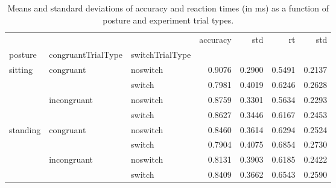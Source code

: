 \begin{table}
\centering
\caption{Means and standard deviations of accuracy and reaction times (in ms) as a function of posture and experiment trial types.}
\label{table-task-switching-replication-reaction-time}
\begin{tabular}{lllrrrr}
\toprule
         &             &        & accuracy &    std &     rt &    std \\
posture & congruantTrialType & switchTrialType &          &        &        &        \\
\midrule
sitting & congruant & noswitch &   0.9076 & 0.2900 & 0.5491 & 0.2137 \\
         &             & switch &   0.7981 & 0.4019 & 0.6246 & 0.2628 \\
         & incongruant & noswitch &   0.8759 & 0.3301 & 0.5634 & 0.2293 \\
         &             & switch &   0.8627 & 0.3446 & 0.6167 & 0.2453 \\
standing & congruant & noswitch &   0.8460 & 0.3614 & 0.6294 & 0.2524 \\
         &             & switch &   0.7904 & 0.4075 & 0.6854 & 0.2730 \\
         & incongruant & noswitch &   0.8131 & 0.3903 & 0.6185 & 0.2422 \\
         &             & switch &   0.8409 & 0.3662 & 0.6543 & 0.2590 \\
\bottomrule
\end{tabular}
\end{table}

